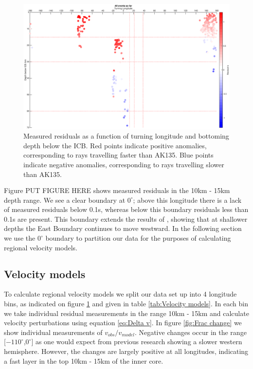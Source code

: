 \documentclass[11pt,a4paper]{article}
\begin{document}
\begin{figure}
	\centering
	\includegraphics[width=\textwidth]{figures/all_longitude}
	\caption{Measured residuals as a function of turning longitude and bottoming depth below the ICB. Red points indicate positive anomalies, corresponding to rays travelling faster than AK135. Blue points indicate negative anomalies, corresponding to rays travelling slower than AK135. }
	\label{fig:All longitude}
\end{figure}

Figure PUT FIGURE HERE shows measured residuals in the 10km - 15km depth range. We see a clear boundary at $0^{\circ}$; above this longitude there is a lack of measured residuals below 0.1s, whereas below this boundary residuals less than 0.1s are present. This boundary extends the results of \cite{Waszek2011a}, showing that at shallower depths the East Boundary continues to move westward. In the following section we use the $0^{\circ}$ boundary to partition our data for the purposes of calculating regional velocity models.

\subsection{Velocity models}
To calculate regional velocity models we split our data set up into 4 longitude bins, as indicated on figure \ref{fig:All longitude} and given in table \ref{tab:Velocity models}. In each bin we take individual residual measurements in the range 10km - 15km and calculate velocity perturbations using equation \eqref{eq:Delta v}. In figure \ref{fig:Frac change} we show individual measurements of $v_{obs} / v_{model}$. Negative changes occur in the range [$-110^{\circ}$,$0^{\circ}$] as one would expect from previous research showing a slower western hemisphere. However, the changes are largely positive at all longitudes, indicating a fast layer in the top 10km - 15km of the inner core.
\end{document}
